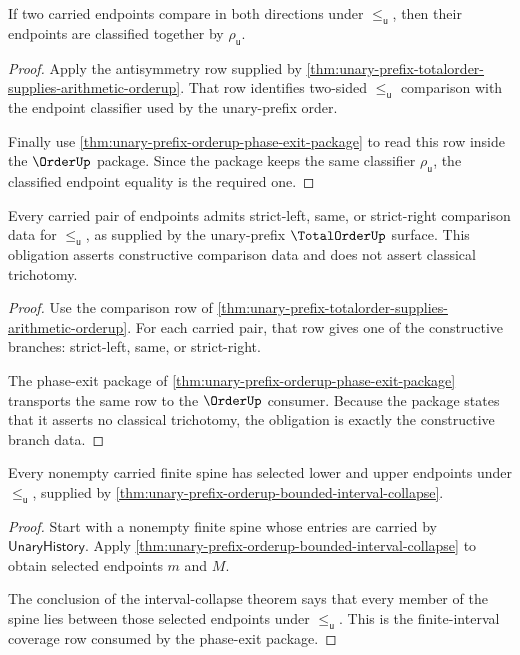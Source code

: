 \begin{theorem}
\label{thm:unary-prefix-orderup-antisymmetry-obligation}
If two carried endpoints compare in both directions under $\le_{\mathsf{u}}$,
then their endpoints are classified together by $\rho_{\mathsf{u}}$.
\end{theorem}
\begin{proof}
Apply the antisymmetry row supplied by
\autoref{thm:unary-prefix-totalorder-supplies-arithmetic-orderup}. That row
identifies two-sided $\le_{\mathsf{u}}$ comparison with the endpoint classifier
used by the unary-prefix order.

Finally use \autoref{thm:unary-prefix-orderup-phase-exit-package} to read this
row inside the $\OrderUp$ package. Since the package keeps the same classifier
$\rho_{\mathsf{u}}$, the classified endpoint equality is the required one.
\end{proof}

\begin{theorem}
\label{thm:unary-prefix-orderup-constructive-comparison-obligation}
Every carried pair of endpoints admits strict-left, same, or strict-right
comparison data for $\le_{\mathsf{u}}$, as supplied by the unary-prefix
$\TotalOrderUp$ surface. This obligation asserts constructive comparison data
and does not assert classical trichotomy.
\end{theorem}
\begin{proof}
Use the comparison row of
\autoref{thm:unary-prefix-totalorder-supplies-arithmetic-orderup}. For each
carried pair, that row gives one of the constructive branches: strict-left,
same, or strict-right.

The phase-exit package of
\autoref{thm:unary-prefix-orderup-phase-exit-package} transports the same row to
the $\OrderUp$ consumer. Because the package states that it asserts no
classical trichotomy, the obligation is exactly the constructive branch data.
\end{proof}

\begin{theorem}
\label{thm:unary-prefix-orderup-finite-interval-coverage-obligation}
Every nonempty carried finite spine has selected lower and upper endpoints
under $\le_{\mathsf{u}}$, supplied by
\autoref{thm:unary-prefix-orderup-bounded-interval-collapse}.
\end{theorem}
\begin{proof}
Start with a nonempty finite spine whose entries are carried by
$\mathsf{UnaryHistory}$. Apply
\autoref{thm:unary-prefix-orderup-bounded-interval-collapse} to obtain selected
endpoints $m$ and $M$.

The conclusion of the interval-collapse theorem says that every member of the
spine lies between those selected endpoints under $\le_{\mathsf{u}}$. This is
the finite-interval coverage row consumed by the phase-exit package.
\end{proof}

